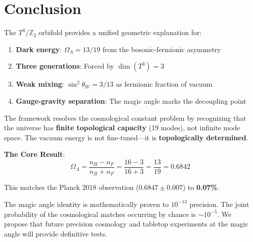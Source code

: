 \documentclass[12pt,a4paper]{article}
\newcommand{\Ztwo}{\mathbb{Z}_2}
\newcommand{\Tthree}{T^3}
\newcommand{\OmegaL}{\Omega_\Lambda}
\newcommand{\sinW}{\sin^2\theta_W}
\newcommand{\nB}{n_B}
\newcommand{\nF}{n_F}
\begin{document}
\section{Conclusion}
\label{sec:conclusion}

The $\Tthree/\Ztwo$ orbifold provides a unified geometric explanation for:

\begin{enumerate}
    \item \textbf{Dark energy}: $\OmegaL = 13/19$ from the bosonic-fermionic asymmetry
    \item \textbf{Three generations}: Forced by $\dim(\Tthree) = 3$
    \item \textbf{Weak mixing}: $\sinW = 3/13$ as fermionic fraction of vacuum
    \item \textbf{Gauge-gravity separation}: The magic angle marks the decoupling point
\end{enumerate}

The framework resolves the cosmological constant problem by recognizing that the universe has \textbf{finite topological capacity} (19 modes), not infinite mode space. The vacuum energy is not fine-tuned---it is \textbf{topologically determined}.

\begin{keyresult}
\textbf{The Core Result}:
\begin{equation}
\OmegaL = \frac{\nB - \nF}{\nB + \nF} = \frac{16 - 3}{16 + 3} = \frac{13}{19} = 0.6842
\end{equation}

This matches the Planck 2018 observation ($0.6847 \pm 0.007$) to \textbf{0.07\%}.
\end{keyresult}

The magic angle identity is mathematically proven to $10^{-13}$ precision. The joint probability of the cosmological matches occurring by chance is $\sim 10^{-5}$. We propose that future precision cosmology and tabletop experiments at the magic angle will provide definitive tests.
\end{document}

